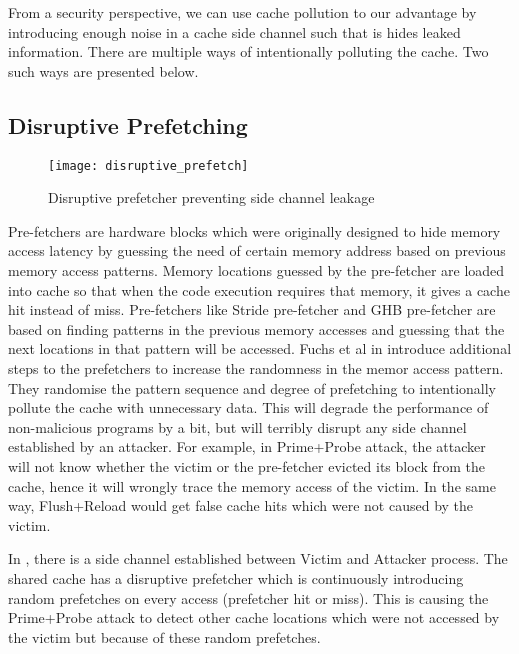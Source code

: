 From a security perspective, we can use cache pollution to our advantage by
introducing enough noise in a cache side channel such that is hides leaked
information. There are multiple ways of intentionally polluting the cache. Two
such ways are presented below.

\subsection{Disruptive Prefetching} \label{sec:disruptive-section}

\begin{figure}[ht]
    \centering
    \texttt{[image: disruptive\_prefetch]}
    \caption{Disruptive prefetcher preventing side channel leakage}
    \label{fig:disruptive_prefetch}
\end{figure}

Pre-fetchers are hardware blocks which were originally designed to hide memory
access latency by guessing the need of certain memory address based on
previous memory access patterns. Memory locations guessed by the pre-fetcher
are loaded into cache so that when the code execution requires that memory, it
gives a cache hit instead of miss. Pre-fetchers like Stride pre-fetcher and
GHB pre-fetcher are based on finding patterns in the previous memory accesses
and guessing that the next locations in that pattern will be accessed. Fuchs
et al in  introduce additional steps to the prefetchers
to increase the randomness in the memor access pattern. They randomise the
pattern sequence and degree of prefetching to intentionally pollute the cache with
unnecessary data. This will degrade the performance of non-malicious programs
by a bit, but will terribly disrupt any side channel established by an
attacker. For example, in Prime+Probe attack, the attacker will not know
whether the victim or the pre-fetcher evicted its block from the cache, hence
it will wrongly trace the memory access of the victim. In the same way,
Flush+Reload would get false cache hits which were not caused by the victim.

In , there is a side channel established
between Victim and Attacker process. The shared cache has a disruptive
prefetcher which is continuously introducing random prefetches on every access
(prefetcher hit or miss). This is causing the Prime+Probe attack to detect
other cache locations which  were not accessed by the victim but because of
these random prefetches.

